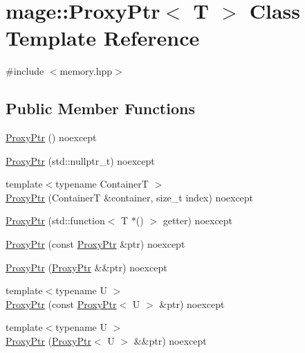 \hypertarget{classmage_1_1_proxy_ptr}{}\section{mage\+:\+:Proxy\+Ptr$<$ T $>$ Class Template Reference}
\label{classmage_1_1_proxy_ptr}


{\ttfamily \#include $<$memory.\+hpp$>$}

\subsection*{Public Member Functions}
\begin{DoxyCompactItemize}
\item 
\mbox{\hyperlink{classmage_1_1_proxy_ptr_a6fadf61cdc71e1d6bc9ac666eda5d2c6}{Proxy\+Ptr}} () noexcept
\item 
\mbox{\hyperlink{classmage_1_1_proxy_ptr_aaad9140d67d5c0a8694e94973234676a}{Proxy\+Ptr}} (std\+::nullptr\+\_\+t) noexcept
\item 
{\footnotesize template$<$typename ContainerT $>$ }\\\mbox{\hyperlink{classmage_1_1_proxy_ptr_a52d2afaf6a037026a4694a074f21a54f}{Proxy\+Ptr}} (ContainerT \&container, size\+\_\+t index) noexcept
\item 
\mbox{\hyperlink{classmage_1_1_proxy_ptr_a964d48ac831c8c179edca90bdfcc5b0b}{Proxy\+Ptr}} (std\+::function$<$ T $\ast$() $>$ getter) noexcept
\item 
\mbox{\hyperlink{classmage_1_1_proxy_ptr_aa31b385e10ba8ab7ce91791078e9ed6d}{Proxy\+Ptr}} (const \mbox{\hyperlink{classmage_1_1_proxy_ptr}{Proxy\+Ptr}} \&ptr) noexcept
\item 
\mbox{\hyperlink{classmage_1_1_proxy_ptr_a51e4a025cd9ca419a2c4b687b4c430bb}{Proxy\+Ptr}} (\mbox{\hyperlink{classmage_1_1_proxy_ptr}{Proxy\+Ptr}} \&\&ptr) noexcept
\item 
{\footnotesize template$<$typename U $>$ }\\\mbox{\hyperlink{classmage_1_1_proxy_ptr_a8d31b3e0e83c73067ad513e9d8fdbc4e}{Proxy\+Ptr}} (const \mbox{\hyperlink{classmage_1_1_proxy_ptr}{Proxy\+Ptr}}$<$ U $>$ \&ptr) noexcept
\item 
{\footnotesize template$<$typename U $>$ }\\\mbox{\hyperlink{classmage_1_1_proxy_ptr_a656e54f6c8f7b7407a66c03c7f6e918f}{Proxy\+Ptr}} (\mbox{\hyperlink{classmage_1_1_proxy_ptr}{Proxy\+Ptr}}$<$ U $>$ \&\&ptr) noexcept
\item 

\end{DoxyCompactItemize}
